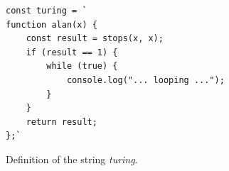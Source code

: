 \begin{figure}[!h]
  \centering
\begin{verbatim}  
const turing = `
function alan(x) {
    const result = stops(x, x);
    if (result == 1) {
        while (true) {
            console.log("... looping ...");
        }
    }
    return result;
};`
\end{verbatim}
  \vspace*{-0.3cm}
  \caption{Definition of the string \textsl{turing}.}
  \label{fig:turing-string}
\end{figure}

